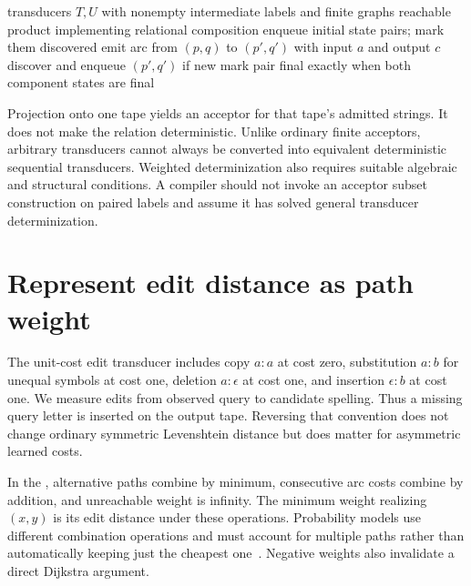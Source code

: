 \begin{algorithm}[htbp]
\caption{Construct reachable composition when intermediate labels contain no epsilon.}
\label{alg:ch79-compose}
\begin{pseudocode}
\Require transducers $T,U$ with nonempty intermediate labels and finite graphs
\Ensure reachable product implementing relational composition
\State enqueue initial state pairs; mark them discovered
\State emit arc from $(p,q)$ to $(p',q')$ with input $a$ and output $c$
\State discover and enqueue $(p',q')$ if new
\EndFor
\State mark pair final exactly when both component states are final
\EndWhile
\end{pseudocode}
\end{algorithm}

Projection onto one tape yields an acceptor for that tape's admitted strings.
It does not make the relation deterministic.
Unlike ordinary finite acceptors, arbitrary transducers cannot always be converted into equivalent deterministic sequential transducers.
Weighted determinization also requires suitable algebraic and structural conditions.
A compiler should not invoke an acceptor subset construction on paired labels and assume it has solved general transducer determinization.

\section{Represent edit distance as path weight}
\label{sec:ch79-edit}
The unit-cost edit transducer includes copy $a:a$ at cost zero, substitution $a:b$ for unequal symbols at cost one, deletion $a:\epsilon$ at cost one, and insertion $\epsilon:b$ at cost one.
We measure edits from observed query to candidate spelling.
Thus a missing query letter is inserted on the output tape.
Reversing that convention does not change ordinary symmetric Levenshtein distance but does matter for asymmetric learned costs.

In the , alternative paths combine by minimum, consecutive arc costs combine by addition, and unreachable weight is infinity.
The minimum weight realizing $(x,y)$ is its edit distance under these operations.
Probability models use different combination operations and must account for multiple paths rather than automatically keeping just the cheapest one~\cite{mohri-2009-weighted}.
Negative weights also invalidate a direct Dijkstra argument.

